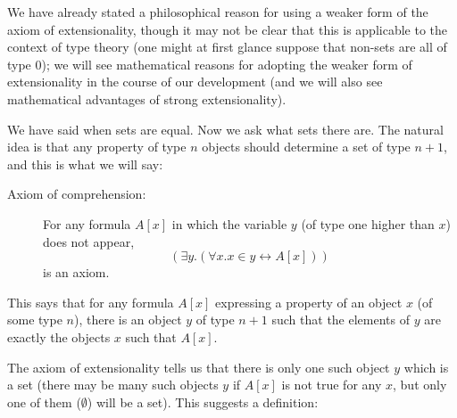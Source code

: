 \documentclass[12pt]{book}
\begin{document}
We have already stated a philosophical reason for using a weaker form
of the axiom of extensionality, though it may not be clear that this
is applicable to the context of type theory (one might at first glance
suppose that non-sets are all of type 0); we will see mathematical
reasons for adopting the weaker form of extensionality in the course
of our development (and we will also see mathematical advantages of
strong extensionality).

We have said when sets are equal.  Now we ask what sets there are.
The natural idea is that any property of type $n$ objects should
determine a set of type $n+1$, and this is what we will say:

\begin{description}
\item[Axiom of comprehension:] 

For any formula $A[x]$ in which the
variable $y$ (of type one higher than $x$) does not appear, $$(\exists
y.(\forall x.x \in y \leftrightarrow A[x]))$$ is an axiom.

\end{description}

This says that for any formula $A[x]$ expressing a property of an
object $x$ (of some type $n$), there is an object $y$ of type $n+1$ such
that the elements of $y$ are exactly the objects $x$ such that $A[x]$.

The axiom of extensionality tells us that there is only one such
object $y$ which is a set (there may be many such objects $y$ if
$A[x]$ is not true for any $x$, but only one of them ($\emptyset$)
will be a set). This suggests a definition:
\end{document}

